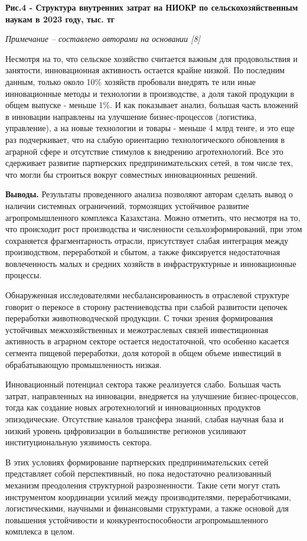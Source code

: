 {\bfseries Рис.4 - Структура внутренних затрат на НИОКР по сельскохозяйственным наукам в 2023 году, тыс. тг}

\emph{Примечание -- составлено авторами на основании {[}8{]}}

\begin{multicols}{2}
Несмотря на то, что сельское хозяйство считается важным для
продовольствия и занятости, инновационная активность остается крайне
низкой. По последним данным, только около 10\% хозяйств пробовали
внедрять те или иные инновационные методы и технологии в производстве, а
доля такой продукции в общем выпуске - меньше 1\%. И как показывает
анализ, большая часть вложений в инновации направлены на улучшение
бизнес-процессов (логистика, управление), а на новые технологии и товары
- меньше 4 млрд тенге, и это еще раз подчеркивает, что на слабую
ориентацию технологического обновления в аграрной сфере и отсутствие
стимулов к внедрению агротехнологий. Все это сдерживает развитие
партнерских предпринимательских сетей, в том числе тех, что могли бы
строиться вокруг совместных инновационных решений.

{\bfseries Выводы.} Результаты проведенного анализа позволяют авторам
сделать вывод о наличии системных ограничений, тормозящих устойчивое
развитие агропромышленного комплекса Казахстана. Можно отметить, что
несмотря на то, что происходит рост производства и численности
сельхозформирований, при этом сохраняется фрагментарность отрасли,
присутствует слабая интеграция между производством, переработкой и
сбытом, а также фиксируется недостаточная вовлеченность малых и средних
хозяйств в инфраструктурные и инновационные процессы.

Обнаруженная исследователями несбалансированность в отраслевой структуре
говорит о перекосе в сторону растениеводства при слабой развитости
цепочек переработки животноводческой продукции. С точки зрения
формирования устойчивых межхозяйственных и межотраслевых связей
инвестиционная активность в аграрном секторе остается недостаточной, что
особенно касается сегмента пищевой переработки, доля которой в общем
объеме инвестиций в обрабатывающую промышленность низкая.

Инновационный потенциал сектора также реализуется слабо. Большая часть
затрат, направленных на инновации, внедряется на улучшение
бизнес-процессов, тогда как создание новых агротехнологий и
инновационных продуктов эпизодические. Отсутствие каналов трансфера
знаний, слабая научная база и низкий уровень цифровизации в большинстве
регионов усиливают институциональную уязвимость сектора.

В этих условиях формирование партнерских предпринимательских сетей
представляет собой перспективный, но пока недостаточно реализованный
механизм преодоления структурной разрозненности. Такие сети могут стать
инструментом координации усилий между производителями, переработчиками,
логистическими, научными и финансовыми структурами, а также основой для
повышения устойчивости и конкурентоспособности агропромышленного
комплекса в целом.
\end{multicols}

